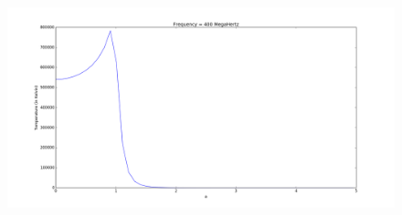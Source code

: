 \documentclass[journal]{IEEEtran}
\begin{document}
\begin{figure}[h!]
  \includegraphics[width=15cm, height=10cm]{freq=400MC.png}
  \label{fig:result2}
\end{figure}  


\ifCLASSOPTIONcaptionsoff
  \newpage
\fi





%
%
%

% 
\end{document}
